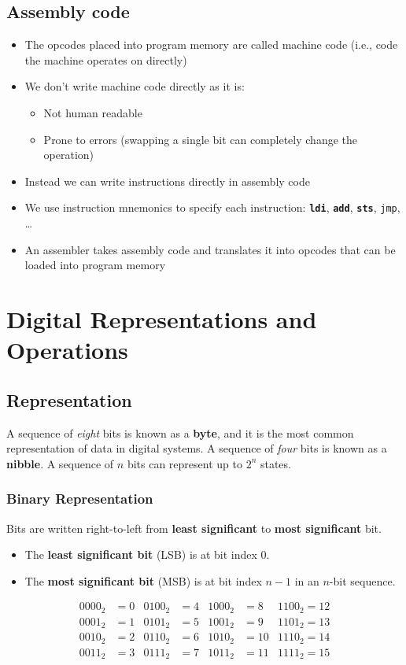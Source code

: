 \documentclass[a4paper]{report}
\newcommand{\keywordinline}[1]{\textcolor[rgb]{0.00,0.50,0.00}{\textbf{\texttt{#1}}}}
\begin{document}
\section{Assembly code}
\begin{itemize}
    \item The opcodes placed into program memory are called machine
          code (i.e., code the machine operates on directly)
    \item We don't write machine code directly as it is:
          \begin{itemize}
              \item Not human readable
              \item Prone to errors (swapping a single bit can
                    completely change the operation)
          \end{itemize}
    \item Instead we can write instructions directly in assembly code
    \item We use instruction mnemonics to specify each instruction:\@
          \keywordinline{ldi}, \keywordinline{add},
          \keywordinline{sts}, \texttt{jmp}, \dots
    \item An assembler takes assembly code and translates it into
          opcodes that can be loaded into program memory
\end{itemize}
\chapter{Digital Representations and Operations}
\section{Representation}
A sequence of \textit{eight} bits is known as a \textbf{byte}, and it
is the most common representation of data in digital systems. A
sequence of \textit{four} bits is known as a \textbf{nibble}. A
sequence of \(n\) bits can represent up to \(2^n\) states.
\subsection{Binary Representation}
Bits are written right-to-left from \textbf{least significant} to
\textbf{most significant} bit.
\begin{itemize}
    \item The \textbf{least significant bit} (LSB) is at bit index 0.
    \item The \textbf{most significant bit} (MSB) is at bit index \(n -
          1\) in an \(n\)-bit sequence.
\end{itemize}
\begin{align*}
    0000_2 & = 0 & 0100_2 & = 4 & 1000_2 & = 8  & 1100_2 = 12  \\
    0001_2 & = 1 & 0101_2 & = 5 & 1001_2 & = 9  & 1101_2 = 13  \\
    0010_2 & = 2 & 0110_2 & = 6 & 1010_2 & = 10 & 1110_2 = 14  \\
    0011_2 & = 3 & 0111_2 & = 7 & 1011_2 & = 11 & 1111_2 = 15
\end{align*}
\end{document}
